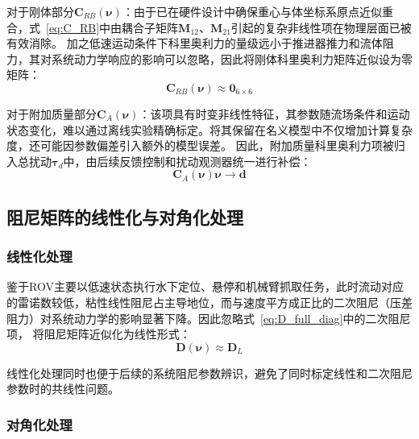 对于刚体部分$\boldsymbol{C}_{RB}(\boldsymbol{\nu})$：由于已在硬件设计中确保重心与体坐标系原点近似重合，式~\eqref{eq:C_RB}中由耦合子矩阵$\boldsymbol{M}_{12}$、$\boldsymbol{M}_{21}$引起的复杂非线性项在物理层面已被有效消除。
加之低速运动条件下科里奥利力的量级远小于推进器推力和流体阻力，其对系统动力学响应的影响可以忽略，因此将刚体科里奥利力矩阵近似设为零矩阵：
\begin{equation}
    \boldsymbol{C}_{RB}(\boldsymbol{\nu})\approx \boldsymbol{0}_{6\times6}
\end{equation}


对于附加质量部分$\boldsymbol{C}_{A}(\boldsymbol{\nu})$：该项具有时变非线性特征，其参数随流场条件和运动状态变化，难以通过离线实验精确标定。将其保留在名义模型中不仅增加计算复杂度，还可能因参数偏差引入额外的模型误差。
因此，附加质量科里奥利力项被归入总扰动$\boldsymbol{\tau}_d$中，由后续反馈控制和扰动观测器统一进行补偿：
\begin{equation}
    \boldsymbol{C}_{A}(\boldsymbol{\nu})\boldsymbol{\nu} \rightarrow \boldsymbol{d}
\end{equation}

\subsection{阻尼矩阵的线性化与对角化处理}

\subsubsection{线性化处理}



鉴于ROV主要以低速状态执行水下定位、悬停和机械臂抓取任务，此时流动对应的雷诺数较低，粘性线性阻尼占主导地位，而与速度平方成正比的二次阻尼（压差阻力）对系统动力学的影响显著下降。因此忽略式~\eqref{eq:D_full_diag}中的二次阻尼项，
将阻尼矩阵近似化为线性形式：
\begin{equation}
    \boldsymbol{D}(\boldsymbol{\nu})\approx \boldsymbol{D}_{L}
\end{equation}

线性化处理同时也便于后续的系统阻尼参数辨识，避免了同时标定线性和二次阻尼参数时的共线性问题。

\subsubsection{对角化处理}

